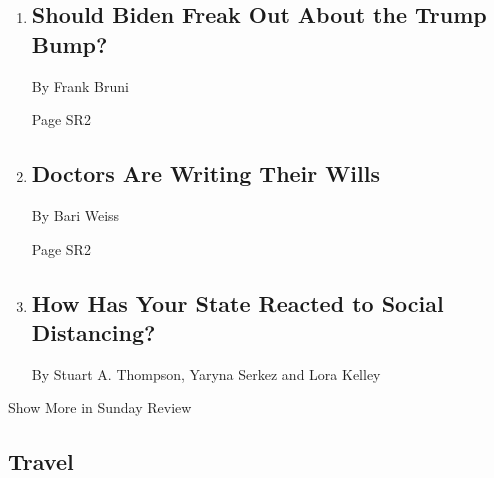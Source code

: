 \begin{enumerate}
\def\labelenumi{\arabic{enumi}.}
\item
  \href{/2020/03/27/opinion/sunday/coronavirus-trump-polls-approval.html}{}

  \hypertarget{should-biden-freak-out-about-the-trump-bump}{%
  \subsection{Should Biden Freak Out About the Trump
  Bump?}\label{should-biden-freak-out-about-the-trump-bump}}

  By Frank Bruni

  Page SR2
\item
  \href{/2020/03/26/opinion/sunday/doctors-coronavirus-safety.html}{}

  \hypertarget{doctors-are-writing-their-wills}{%
  \subsection{Doctors Are Writing Their
  Wills}\label{doctors-are-writing-their-wills}}

  By Bari Weiss

  Page SR2
\item
  \href{/interactive/2020/03/23/opinion/coronavirus-economy-recession.html}{}

  \hypertarget{how-has-your-state-reacted-to-social-distancing}{%
  \subsection{How Has Your State Reacted to Social
  Distancing?}\label{how-has-your-state-reacted-to-social-distancing}}

  By Stuart A. Thompson, Yaryna Serkez and Lora Kelley
\end{enumerate}

Show More in Sunday Review

\hypertarget{travel}{%
\subsection{Travel}\label{travel}}

